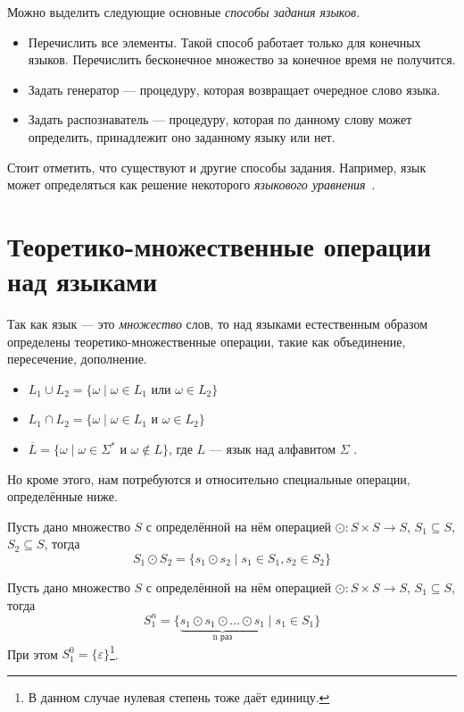 Можно выделить следующие основные \textit{способы задания языков.}
\begin{itemize}
\item Перечислить все элементы. Такой способ работает только для конечных языков. Перечислить бесконечное множество за конечное время не получится.
\item Задать генератор --- процедуру, которая возвращает очередное слово языка.
\item Задать распознаватель --- процедуру, которая по данному слову может определить, принадлежит оно заданному языку или нет.
\end{itemize}

Стоит отметить, что существуют и другие способы задания.
Например, язык может определяться как решение некоторого \textit{языкового уравнения}~\cite{Leiss1999}.

\section{Теоретико-множественные операции над языками}

Так как язык --- это \textit{множество} слов, то над языками естественным образом определены теоретико-множественные операции, такие как объединение, пересечение, дополнение.
\begin{itemize}
  \item $L_1 \cup L_2 = \{ \omega \mid \omega \in L_1 \text{ или } \omega \in L_2\}$
  \item $L_1 \cap L_2 = \{ \omega \mid \omega \in L_1 \text{ и } \omega \in L_2\}$
  \item $\overline{L} = \{ \omega \mid \omega \in \Sigma^* \text{ и } \omega \notin L\}$, где $L$ --- язык над алфавитом $\Sigma$ .
\end{itemize}

Но кроме этого, нам потребуются и относительно специальные операции, определённые ниже.

\begin{definition}
Пусть дано множество $S$ с определённой на нём операцией $\odot: S \times S \to S$, $S_1 \subseteq S$, $S_2 \subseteq S$, тогда 
$$
S_1 \odot S_2 = \{ s_1 \odot s_2 \mid s_1 \in S_1, s_2 \in S_2\}
$$
\end{definition}

\begin{definition}
Пусть дано множество $S$ с определённой на нём операцией $\odot: S \times S \to S$, $S_1 \subseteq S$, тогда 
$$
S_1 ^ n = \{ \underbrace{s_1 \odot s_1 \odot \ldots \odot s_1}_{\text{n раз}} \mid s_1 \in S_1\}
$$
При этом $S_1^0 = \{\varepsilon\}$\footnote{В данном случае нулевая степень тоже даёт единицу.}.
\end{definition}


